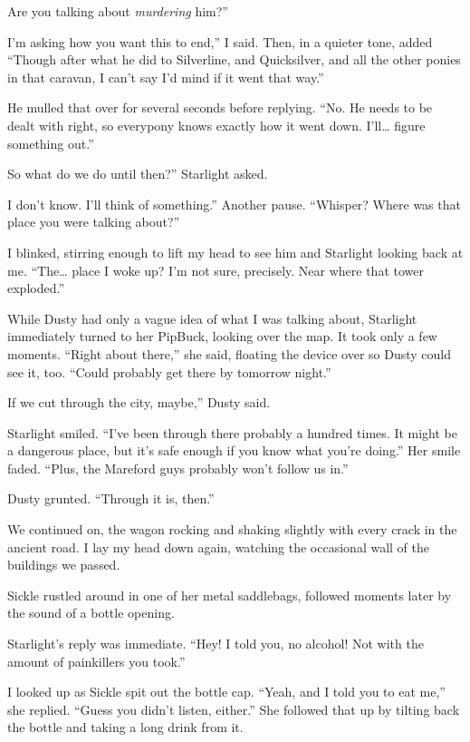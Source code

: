 \leavevmode{}Are you talking about \textit{murdering} him?”

\leavevmode{}I’m asking how you want this to end,” I said. Then, in a quieter tone, added “Though after what he did to Silverline, and Quicksilver, and all the other ponies in that caravan, I can’t say I’d mind if it went that way.”

He mulled that over for several seconds before replying. “No. He needs to be dealt with right, so everypony knows exactly how it went down. I’ll… figure something out.”

\leavevmode{}So what do we do until then?” Starlight asked.

\leavevmode{}I don’t know. I’ll think of something.” Another pause. “Whisper? Where was that place you were talking about?”

I blinked, stirring enough to lift my head to see him and Starlight looking back at me. “The… place I woke up? I’m not sure, precisely. Near where that tower exploded.”

While Dusty had only a vague idea of what I was talking about, Starlight immediately turned to her PipBuck, looking over the map. It took only a few moments. “Right about there,” she said, floating the device over so Dusty could see it, too. “Could probably get there by tomorrow night.”

\leavevmode{}If we cut through the city, maybe,” Dusty said.

Starlight smiled. “I’ve been through there probably a hundred times. It might be a dangerous place, but it’s safe enough if you know what you’re doing.” Her smile faded. “Plus, the Mareford guys probably won’t follow us in.”

Dusty grunted. “Through it is, then.”

We continued on, the wagon rocking and shaking slightly with every crack in the ancient road. I lay my head down again, watching the occasional wall of the buildings we passed.

Sickle rustled around in one of her metal saddlebags, followed moments later by the sound of a bottle opening.

Starlight’s reply was immediate. “Hey! I told you, no alcohol! Not with the amount of painkillers you took.”

I looked up as Sickle spit out the bottle cap. “Yeah, and I told you to eat me,” she replied. “Guess you didn’t listen, either.” She followed that up by tilting back the bottle and taking a long drink from it.

